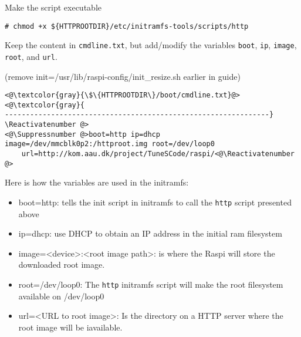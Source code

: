 Make the script executable
\begin{lstlisting}[]
# chmod +x ${HTTPROOTDIR}/etc/initramfs-tools/scripts/http
\end{lstlisting}
\FloatBarrier
\vspace{-5mm}

Keep the content in \texttt{cmdline.txt}, but add/modify the variables
\texttt{boot}, \texttt{ip}, \texttt{image}, \texttt{root}, and \texttt{url}.


(remove init=/usr/lib/raspi-config/init\_resize.sh earlier in guide)
\Suppressnumber\begin{lstlisting}[]
<@\textcolor{gray}{\$\{HTTPROOTDIR\}/boot/cmdline.txt}@>
<@\textcolor{gray}{
---------------------------------------------------------------}
\Reactivatenumber @>
<@\Suppressnumber @>boot=http ip=dhcp image=/dev/mmcblk0p2:/httproot.img root=/dev/loop0
    url=http://kom.aau.dk/project/TuneSCode/raspi/<@\Reactivatenumber @>
\end{lstlisting}
\FloatBarrier
\vspace{-5mm}

Here is how the variables are used in the initramfs:
\begin{itemize}
    \item boot=http: tells the init script in initramfs to call the \texttt{http} script presented above
    \item ip=dhcp: use \ac{DHCP} to obtain an \ac{IP} address in the initial ram filesystem
    \item image=<device>:<root image path>: is where the \ac{Raspi} will store the downloaded root image.
    \item root=/dev/loop0: The \texttt{http} initramfs script will make the root filesystem available on /dev/loop0
    \item url=<URL to root image>: Is the directory on a \ac{HTTP} server where the root image will be iavailable.
\end{itemize}





